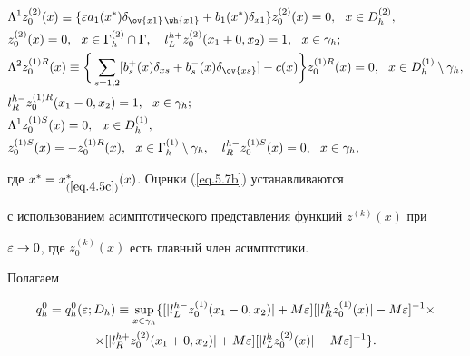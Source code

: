 \begin{align}\label{eq.5.8}


& \La^1 z^{(2)}_0(x) \eq \{ \eps a_1(x^*)\de_{\ov{x1}\,\wh{x1}} +


b_1(x^*)\de_{x1}\} z^{(2)}_0(x) = 0, \ \ x\in D^{(2)}_h, \\


%


& z^{(2)}_0(x) = 0, \ \ x\in\G^{(2)}_h\cap\G, \quad


l^{h+}_L z^{(2)}_0(x_1+0, x_2) = 1, \ \ x\in\gamma_h;\notag \\


%


& \La^2 z^{(1)R}_0(x) \eq \bigg\{ \sum_{s=1,2} [b_s^{+}(x)\delta_{xs}


+ b_s^{-}(x)\delta_{\ov{xs}}] - c(x) \bigg\} z^{(1)R}_0(x) = 0,


\ \ x \in D_h^{(1)} \setminus \gamma_h, \notag \\


%


& l^{h-}_R z^{(1)R}_0(x_1-0, x_2) = 1, \ \ x\in\gamma_h; \notag \\


%


& \La^1 z^{(1)S}_0(x) = 0, \ \ x\in D^{(1)}_h, \notag \\


%


& z^{(1)S}_0(x) = - z^{(1)R}_0(x), \ \


x \in\G^{(1)}_h \setminus \gamma_h,


\quad l^{h-}_R z^{(1)S}_0(x) = 0, \ \ x\in\gamma_h, \notag


\end{align}


где $x^*=x^*_{(\ref{eq.4.5c})}(x)$. Оценки (\ref{eq.5.7b}) устанавливаются


с использованием асимптотического представления функций $z^{(k)}(x)$ при


$\varepsilon\rightarrow 0$, где $z^{(k)}_0(x)$ есть главный член асимптотики.





Полагаем


\begin{multline*} %


q^0_h=q^0_h(\eps;D_h)\eq\sup\limits_{x\in\gamma_h}


\{[|l^{h-}_L z^{(1)}_0(x_1-0, x_2)|+


M\eps][|l^{h}_R z^{(1)}_0(x)|-M\eps]^{-1}\times\\


%


\times[|l^{h+}_R z^{(2)}_0(x_1+0, x_2)|+M\eps]


[|l^{h}_L z^{(2)}_0(x)|-M\eps]^{-1}\}.


\end{multline*}


